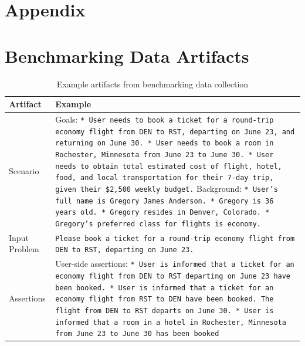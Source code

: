 \appendix
\section*{Appendix}
\section{Benchmarking Data Artifacts}
\label{app:benchmark_artifacts}

\begin{table}[h!]
    \caption{Example artifacts from benchmarking data collection}
    \label{tab:benchmark_artifacts}
    \centering
    \footnotesize
    \begin{tabular}{p{2cm}p{10cm}}
        \toprule
        Artifact & Example \\
        \midrule
        Scenario & Goals: \newline
\texttt{* User needs to book a ticket for a round-trip economy flight from DEN to RST, departing on June 23, and returning on June 30.\newline
* User needs to book a room in Rochester, Minnesota from June 23 to June 30.\newline
* User needs to obtain total estimated cost of flight, hotel, food, and local transportation for their 7-day trip, given their \$2,500 weekly budget.}\newline \newline
Background: \newline
\texttt{* User's full name is Gregory James Anderson.\newline
* Gregory is 36 years old.\newline
* Gregory resides in Denver, Colorado.\newline
* Gregory's preferred class for flights is economy.}  \\
\midrule
Input Problem & \texttt{Please book a ticket for a round-trip economy flight from DEN to RST, departing on June 23.}\\
\midrule
Assertions & User-side assertions:\newline
\texttt{* User is informed that a ticket for an economy flight from DEN to RST departing on June 23 have been booked.\newline
* User is informed that a ticket for an economy flight from RST to DEN have been booked. The flight from DEN to RST departs on June 30.\newline
* User is informed that a room in a hotel in Rochester, Minnesota from June 23 to June 30 has been booked\newline
}
\end{tabular}
\end{table}
